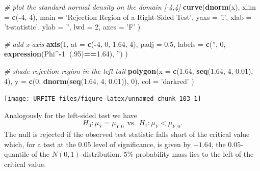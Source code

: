 \documentclass[]{book}
\newenvironment{Shaded}{\begin{snugshade}}{\end{snugshade}}
\newcommand{\KeywordTok}[1]{\textcolor[rgb]{0.13,0.29,0.53}{\textbf{#1}}}
\newcommand{\DataTypeTok}[1]{\textcolor[rgb]{0.13,0.29,0.53}{#1}}
\newcommand{\DecValTok}[1]{\textcolor[rgb]{0.00,0.00,0.81}{#1}}
\newcommand{\FloatTok}[1]{\textcolor[rgb]{0.00,0.00,0.81}{#1}}
\newcommand{\StringTok}[1]{\textcolor[rgb]{0.31,0.60,0.02}{#1}}
\newcommand{\CommentTok}[1]{\textcolor[rgb]{0.56,0.35,0.01}{\textit{#1}}}
\newcommand{\OperatorTok}[1]{\textcolor[rgb]{0.81,0.36,0.00}{\textbf{#1}}}
\newcommand{\NormalTok}[1]{#1}
\theoremstyle{definition}
\theoremstyle{definition}
\theoremstyle{definition}
\theoremstyle{remark}
\begin{document}
\begin{Shaded}
\begin{Highlighting}[]
\CommentTok{# plot the standard normal density on the domain [-4,4]}
\KeywordTok{curve}\NormalTok{(}\KeywordTok{dnorm}\NormalTok{(x),}
      \DataTypeTok{xlim =} \KeywordTok{c}\NormalTok{(}\OperatorTok{-}\DecValTok{4}\NormalTok{, }\DecValTok{4}\NormalTok{),}
      \DataTypeTok{main =} \StringTok{'Rejection Region of a Right-Sided Test'}\NormalTok{,}
      \DataTypeTok{yaxs =} \StringTok{'i'}\NormalTok{,}
      \DataTypeTok{xlab =} \StringTok{'t-statistic'}\NormalTok{,}
      \DataTypeTok{ylab =} \StringTok{''}\NormalTok{,}
      \DataTypeTok{lwd =} \DecValTok{2}\NormalTok{,}
      \DataTypeTok{axes =} \StringTok{'F'}
\NormalTok{)}

\CommentTok{# add x-axis}
\KeywordTok{axis}\NormalTok{(}\DecValTok{1}\NormalTok{, }
     \DataTypeTok{at =} \KeywordTok{c}\NormalTok{(}\OperatorTok{-}\DecValTok{4}\NormalTok{, }\DecValTok{0}\NormalTok{, }\FloatTok{1.64}\NormalTok{, }\DecValTok{4}\NormalTok{), }
     \DataTypeTok{padj =} \FloatTok{0.5}\NormalTok{,}
     \DataTypeTok{labels =} \KeywordTok{c}\NormalTok{(}\StringTok{''}\NormalTok{, }\DecValTok{0}\NormalTok{, }\KeywordTok{expression}\NormalTok{(Phi}\OperatorTok{^-}\DecValTok{1}\OperatorTok{~}\NormalTok{(.}\DecValTok{95}\NormalTok{)}\OperatorTok{==}\FloatTok{1.64}\NormalTok{), }\StringTok{''}\NormalTok{)}
\NormalTok{)}

\CommentTok{# shade rejection region in the left tail}
\KeywordTok{polygon}\NormalTok{(}\DataTypeTok{x =} \KeywordTok{c}\NormalTok{(}\FloatTok{1.64}\NormalTok{, }\KeywordTok{seq}\NormalTok{(}\FloatTok{1.64}\NormalTok{, }\DecValTok{4}\NormalTok{, }\FloatTok{0.01}\NormalTok{), }\DecValTok{4}\NormalTok{),}
        \DataTypeTok{y =} \KeywordTok{c}\NormalTok{(}\DecValTok{0}\NormalTok{, }\KeywordTok{dnorm}\NormalTok{(}\KeywordTok{seq}\NormalTok{(}\FloatTok{1.64}\NormalTok{, }\DecValTok{4}\NormalTok{, }\FloatTok{0.01}\NormalTok{)), }\DecValTok{0}\NormalTok{), }
        \DataTypeTok{col =} \StringTok{'darkred'}
\NormalTok{)}
\end{Highlighting}
\end{Shaded}

\begin{center}\texttt{[image: URFITE\_files/figure-latex/unnamed-chunk-103-1]} \end{center}

Analogously for the left-sided test we have
\[H_0: \mu_Y = \mu_{Y,0} \ \ \text{vs.} \ \ H_1: \mu_Y < \mu_{Y,0}.\]
The null is rejected if the observed test statistic falls short of the
critical value which, for a test at the \(0.05\) level of significance,
is given by \(-1.64\), the \(0.05\)-quantile of the \(N(0,1)\)
distribution. \(5\%\) probability mass lies to the left of the critical
value.
\end{document}
